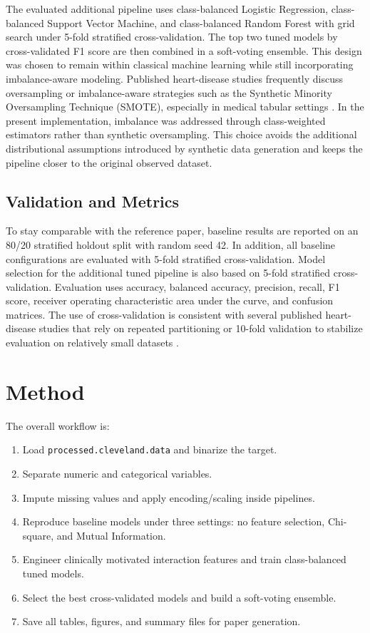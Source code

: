 \documentclass[conference]{IEEEtran}
\begin{document}
The evaluated additional pipeline uses class-balanced Logistic Regression, class-balanced Support Vector Machine, and class-balanced Random Forest with grid search under 5-fold stratified cross-validation. The top two tuned models by cross-validated F1 score are then combined in a soft-voting ensemble. This design was chosen to remain within classical machine learning while still incorporating imbalance-aware modeling. Published heart-disease studies frequently discuss oversampling or imbalance-aware strategies such as the Synthetic Minority Oversampling Technique (SMOTE), especially in medical tabular settings \cite{albert2023oversampling,muhammad2021smote,rehman2025mi}. In the present implementation, imbalance was addressed through class-weighted estimators rather than synthetic oversampling. This choice avoids the additional distributional assumptions introduced by synthetic data generation and keeps the pipeline closer to the original observed dataset.

\subsection{Validation and Metrics}
To stay comparable with the reference paper, baseline results are reported on an 80/20 stratified holdout split with random seed 42. In addition, all baseline configurations are evaluated with 5-fold stratified cross-validation. Model selection for the additional tuned pipeline is also based on 5-fold stratified cross-validation. Evaluation uses accuracy, balanced accuracy, precision, recall, F1 score, receiver operating characteristic area under the curve, and confusion matrices. The use of cross-validation is consistent with several published heart-disease studies that rely on repeated partitioning or 10-fold validation to stabilize evaluation on relatively small datasets \cite{rabbi2018performance,albert2023oversampling,rehman2025mi}.

\section{Method}
The overall workflow is:
\begin{enumerate}
\item Load \texttt{processed.cleveland.data} and binarize the target.
\item Separate numeric and categorical variables.
\item Impute missing values and apply encoding/scaling inside pipelines.
\item Reproduce baseline models under three settings: no feature selection, Chi-square, and Mutual Information.
\item Engineer clinically motivated interaction features and train class-balanced tuned models.
\item Select the best cross-validated models and build a soft-voting ensemble.
\item Save all tables, figures, and summary files for paper generation.
\end{enumerate}
\end{document}
